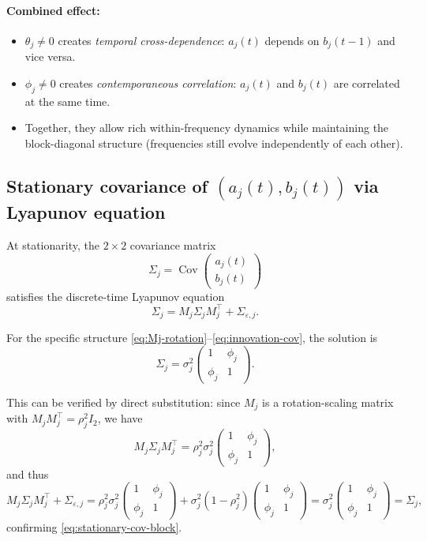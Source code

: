 \documentclass[answers,12pt,addpoints]{exam}
\begin{document}
\paragraph{Combined effect:}
\begin{itemize}
  \item $\theta_j \neq 0$ creates \emph{temporal cross-dependence}: $a_j(t)$ depends on $b_j(t-1)$ and vice versa.
  \item $\phi_j \neq 0$ creates \emph{contemporaneous correlation}: $a_j(t)$ and $b_j(t)$ are correlated at the same time.
  \item Together, they allow rich within-frequency dynamics while maintaining the block-diagonal structure (frequencies still evolve independently of each other).
\end{itemize}

\subsection{Stationary covariance of $(a_j(t), b_j(t))$ via Lyapunov equation}

At stationarity, the $2\times2$ covariance matrix
\[
  \Sigma_{j}
  =
  \operatorname{Cov}\begin{pmatrix}a_j(t)\\b_j(t)\end{pmatrix}
\]
satisfies the discrete-time Lyapunov equation
\begin{equation}
  \Sigma_j = M_j \Sigma_j M_j^\top + \Sigma_{\varepsilon,j}.
  \label{eq:lyapunov-2x2}
\end{equation}

For the specific structure \eqref{eq:Mj-rotation}--\eqref{eq:innovation-cov}, the solution is
\begin{equation}
  \Sigma_j
  =
  \sigma_j^2
  \begin{pmatrix}
    1 & \phi_j \\ \phi_j & 1
  \end{pmatrix}.
  \label{eq:stationary-cov-block}
\end{equation}

This can be verified by direct substitution: since $M_j$ is a rotation-scaling matrix with $M_j M_j^\top = \rho_j^2 I_2$, we have
\[
  M_j \Sigma_j M_j^\top
  =
  \rho_j^2 \sigma_j^2
  \begin{pmatrix} 1 & \phi_j \\ \phi_j & 1 \end{pmatrix},
\]
and thus
\[
  M_j \Sigma_j M_j^\top + \Sigma_{\varepsilon,j}
  =
  \rho_j^2 \sigma_j^2
  \begin{pmatrix} 1 & \phi_j \\ \phi_j & 1 \end{pmatrix}
  +
  \sigma_j^2(1-\rho_j^2)
  \begin{pmatrix} 1 & \phi_j \\ \phi_j & 1 \end{pmatrix}
  =
  \sigma_j^2
  \begin{pmatrix} 1 & \phi_j \\ \phi_j & 1 \end{pmatrix}
  =
  \Sigma_j,
\]
confirming \eqref{eq:stationary-cov-block}.
\end{document}
